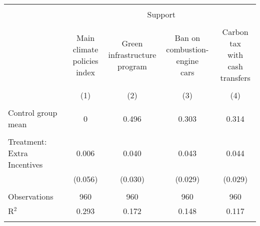 
\begin{tabular}{@{\extracolsep{5pt}}lcccc} 
\\[-1.8ex]\hline 
\hline \\[-1.8ex] 
 & \multicolumn{4}{c}{Support} \\ 
\cline{2-5} 
\\[-1.8ex] & \makecell{Main climate\\policies index} & \makecell{Green\\infrastructure\\program} & \makecell{Ban on\\combustion-engine\\cars} & \makecell{Carbon tax\\with\\cash transfers} \\ 
\\[-1.8ex] & (1) & (2) & (3) & (4)\\ 
\hline \\[-1.8ex] 
Control group mean & 0 & 0.496 & 0.303 & 0.314  \\ \hline \\[-1.8ex]
 Treatment: Extra Incentives & 0.006 & 0.040 & 0.043 & 0.044 \\ 
  & (0.056) & (0.030) & (0.029) & (0.029) \\ 
 \hline \\[-1.8ex] 

Observations & 960 & 960 & 960 & 960 \\ 
R$^{2}$ & 0.293 & 0.172 & 0.148 & 0.117 \\ 
\hline 
\hline \\[-1.8ex] 
\end{tabular} 